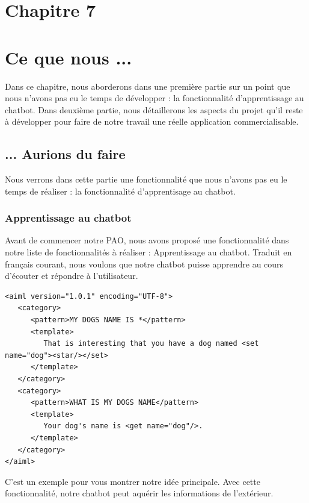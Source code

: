 \section*{Chapitre 7}
\section{Ce que nous ...}
\indent Dans ce chapitre, nous aborderons dans une première partie sur un point que nous n'avons pas eu le temps de développer :  la fonctionnalité d’apprentissage au chatbot. Dans deuxième partie, nous détaillerons les aspects du projet qu'il reste à développer pour faire de notre travail une réelle application commercialisable.

\subsection{... Aurions du faire}
\indent Nous verrons dans cette partie une fonctionnalité que nous n'avons pas eu le temps de réaliser : la fonctionnalité d'apprentisage au chatbot.

\subsubsection{Apprentissage au chatbot}
\indent Avant de commencer notre PAO, nous avons proposé une fonctionnalité dans notre liste de fonctionnalités à réaliser : Apprentissage au chatbot. Traduit en français courant, nous voulons que notre chatbot puisse apprendre au cours d'écouter et répondre à l'utilisateur. 

\begin{lstlisting}[frame=none,aboveskip=0.5em]
<aiml version="1.0.1" encoding="UTF-8">
   <category>
      <pattern>MY DOGS NAME IS *</pattern>
      <template>
         That is interesting that you have a dog named <set name="dog"><star/></set>
      </template>  
   </category>  
   <category>
      <pattern>WHAT IS MY DOGS NAME</pattern>
      <template>
         Your dog's name is <get name="dog"/>.
      </template>  
   </category>  
</aiml>
\end{lstlisting}

\indent C'est un exemple pour vous montrer notre idée principale. Avec cette fonctionnalité, notre chatbot peut aquérir les informations de l'extérieur.

